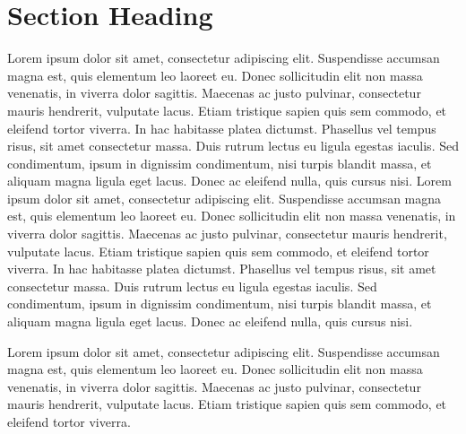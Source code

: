 \documentclass{article}
\begin{document}
\section{Section Heading}

Lorem ipsum dolor sit amet, consectetur adipiscing elit. Suspendisse accumsan magna est, quis elementum leo laoreet eu. Donec sollicitudin elit non massa venenatis, in viverra dolor sagittis. Maecenas ac justo pulvinar, consectetur mauris hendrerit, vulputate lacus. Etiam tristique sapien quis sem commodo, et eleifend tortor viverra. In hac habitasse platea dictumst. Phasellus vel tempus risus, sit amet consectetur massa. Duis rutrum lectus eu ligula egestas iaculis. Sed condimentum, ipsum in dignissim condimentum, nisi turpis blandit massa, et aliquam magna ligula eget lacus. Donec ac eleifend nulla, quis cursus nisi. Lorem ipsum dolor sit amet, consectetur adipiscing elit. Suspendisse accumsan magna est, quis elementum leo laoreet eu. Donec sollicitudin elit non massa venenatis, in viverra dolor sagittis. Maecenas ac justo pulvinar, consectetur mauris hendrerit, vulputate lacus. Etiam tristique sapien quis sem commodo, et eleifend tortor viverra. In hac habitasse platea dictumst. Phasellus vel tempus risus, sit amet consectetur massa. Duis rutrum lectus eu ligula egestas iaculis. Sed condimentum, ipsum in dignissim condimentum, nisi turpis blandit massa, et aliquam magna ligula eget lacus. Donec ac eleifend nulla, quis cursus nisi.

Lorem ipsum dolor sit amet, consectetur adipiscing elit. Suspendisse accumsan magna est, quis elementum leo laoreet eu. Donec sollicitudin elit non massa venenatis, in viverra dolor sagittis. Maecenas ac justo pulvinar, consectetur mauris hendrerit, vulputate lacus. Etiam tristique sapien quis sem commodo, et eleifend tortor viverra.




\appendix
\end{document}
